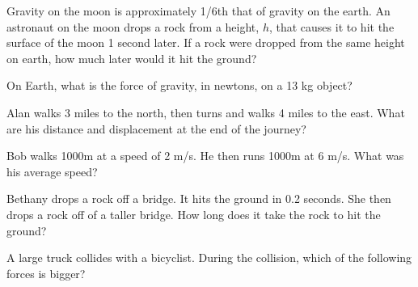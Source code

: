 \documentclass[10pt]{examdesign}
\begin{document}
\begin{multiplechoice} [title={Multiple Choice},
	rearrange=yes]
\begin{question}
	Gravity on the moon is approximately 1/6th that of gravity on the earth.  An astronaut on the moon drops  a rock from a height, $h$, that causes it to hit the surface of the moon 1 second later. If a rock were dropped from the same height on earth, how much later would it hit the ground?
\end{question}



\begin{question}
	On Earth, what is the force of gravity, in newtons, on a 13 kg object?
	
\end{question}

\begin{question}
	Alan walks 3 miles to the north, then turns and walks 4 miles to the east.  What are his distance and displacement at the end of the journey?  
\end{question}

\begin{question}
	Bob walks 1000m at a speed of 2 m/s.  He then runs 1000m at 6 m/s.  What was his average speed? 
	
\end{question}

\begin{question} Bethany drops a rock off a bridge.  It hits the ground in 0.2 seconds.  She then drops a rock off of a taller bridge.  How long does it take the rock to hit the ground? 
\end{question}

\begin{question}
	A large truck collides with a bicyclist. During the collision, which of the following forces is bigger? 
\end{question}






\end{multiplechoice}
\end{document}

